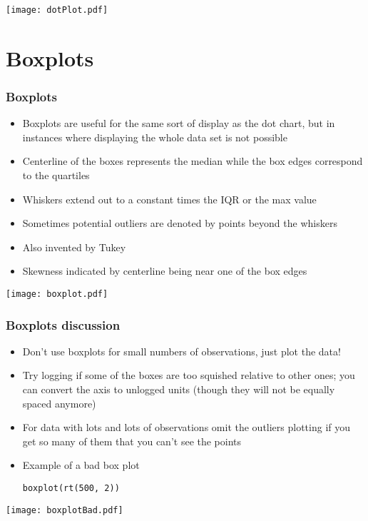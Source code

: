 \documentclass[aspectratio=169]{beamer}
\begin{document}
\begin{frame}
\texttt{[image: dotPlot.pdf]}
\end{frame}


\section{Boxplots}
\begin{frame}\frametitle{Boxplots}
\begin{itemize}
\item Boxplots are useful for the same sort of display as the dot
  chart, but in instances where displaying the whole data set is
  not possible
\item Centerline of the boxes represents the median while the 
  box edges correspond to the quartiles
\item Whiskers extend out to a constant times the IQR or the max value
\item Sometimes potential outliers are denoted by points beyond the whiskers
\item Also invented by Tukey
\item Skewness indicated by centerline being near one of the box edges
\end{itemize}
\end{frame}

\begin{frame}
\texttt{[image: boxplot.pdf]}
\end{frame}

\begin{frame}[fragile]\frametitle{Boxplots discussion}
\begin{itemize}
\item Don't use boxplots for small numbers of observations, just plot the data!
\item Try logging if some of the boxes are too squished relative to other ones;
  you can convert the axis to unlogged units (though they will not be equally spaced
  anymore)
\item For data with lots and lots of observations omit the outliers
  plotting if you get so many of them that you can't see the points
\item Example of a bad box plot
\begin{verbatim}
boxplot(rt(500, 2))
\end{verbatim}
\end{itemize}
\end{frame}

\begin{frame}
\texttt{[image: boxplotBad.pdf]}
\end{frame}
\end{document}
